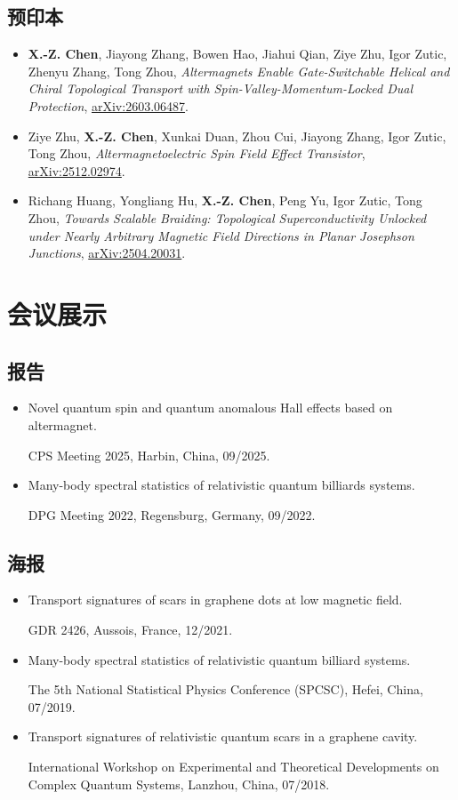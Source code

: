 \documentclass[11pt,a4paper]{article}
\begin{document}
\subsection*{预印本}
\begin{itemize}[leftmargin=1.8em,label={},itemsep=0.55em,topsep=0.3em]
\item[\textbf{[P3]}] \textbf{X.-Z. Chen}, Jiayong Zhang, Bowen Hao, Jiahui Qian, Ziye Zhu, Igor Zutic, Zhenyu Zhang, Tong Zhou, \textit{Altermagnets Enable Gate-Switchable Helical and Chiral Topological Transport with Spin-Valley-Momentum-Locked Dual Protection}, \href{https://arxiv.org/abs/2603.06487}{arXiv:2603.06487}.
\item[\textbf{[P2]}] Ziye Zhu, \textbf{X.-Z. Chen}, Xunkai Duan, Zhou Cui, Jiayong Zhang, Igor Zutic, Tong Zhou, \textit{Altermagnetoelectric Spin Field Effect Transistor}, \href{https://arxiv.org/abs/2512.02974}{arXiv:2512.02974}.
\item[\textbf{[P1]}] Richang Huang, Yongliang Hu, \textbf{X.-Z. Chen}, Peng Yu, Igor Zutic, Tong Zhou, \textit{Towards Scalable Braiding: Topological Superconductivity Unlocked under Nearly Arbitrary Magnetic Field Directions in Planar Josephson Junctions}, \href{https://arxiv.org/abs/2504.20031}{arXiv:2504.20031}.
\end{itemize}

\newpage
\section{会议展示}
\subsection*{报告}
\begin{itemize}
\item Novel quantum spin and quantum anomalous Hall effects based on altermagnet.\par
CPS Meeting 2025, Harbin, China, 09/2025.
\item Many-body spectral statistics of relativistic quantum billiards systems.\par
DPG Meeting 2022, Regensburg, Germany, 09/2022.
\end{itemize}
\subsection*{海报}
\begin{itemize}
\item Transport signatures of scars in graphene dots at low magnetic field.\par
GDR 2426, Aussois, France, 12/2021.
\item Many-body spectral statistics of relativistic quantum billiard systems.\par
The 5th National Statistical Physics Conference (SPCSC), Hefei, China, 07/2019.
\item Transport signatures of relativistic quantum scars in a graphene cavity.\par
International Workshop on Experimental and Theoretical Developments on Complex Quantum Systems, Lanzhou, China, 07/2018.
\end{itemize}
\end{document}

